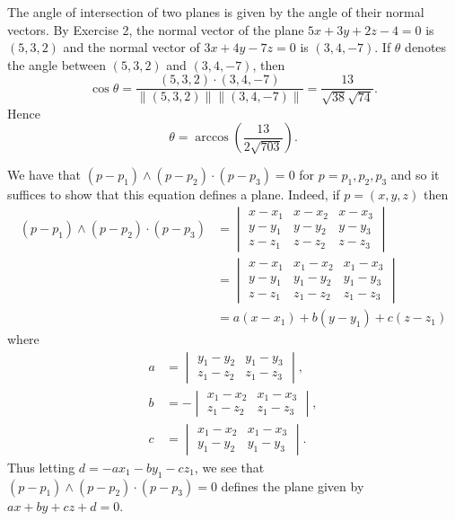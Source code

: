 \begin{ex}
The angle of intersection of two planes is given by the angle of their normal vectors. By Exercise 2, the normal vector of the plane $5x + 3y + 2z - 4 = 0$ is $(5, 3, 2)$ and the normal vector of $3x + 4y - 7z = 0$ is $(3, 4, -7)$. If $\theta$ denotes the angle between $(5, 3, 2)$ and $(3, 4, -7)$, then \[\cos\theta = \frac{(5, 3, 2)\cdot(3, 4, -7)}{\|(5, 3, 2)\|\|(3, 4, -7)\|} = \frac{13}{\sqrt{38}\sqrt{74}}.\] Hence \[\theta = \arccos\left(\frac{13}{2\sqrt{703}}\right).\]
\end{ex}

\begin{ex}
[TODO]
\end{ex}

\begin{ex}
We have that $(p-p_1)\wedge(p-p_2)\cdot(p-p_3) = 0$ for $p = p_1, p_2, p_3$ and so it suffices to show that this equation defines a plane. Indeed, if $p = (x, y, z)$ then
\begin{align*}
(p-p_1)\wedge(p-p_2)\cdot(p-p_3) & = \begin{vmatrix}
x-x_1 & x-x_2 & x-x_3\\
y-y_1 & y-y_2 & y-y_3\\
z-z_1 & z-z_2 & z-z_3
\end{vmatrix}\\
& = \begin{vmatrix}
x-x_1 & x_1-x_2 & x_1-x_3\\
y-y_1 & y_1-y_2 & y_1-y_3\\
z-z_1 & z_1-z_2 & z_1-z_3
\end{vmatrix}\\
& = a(x-x_1) + b(y-y_1) + c(z-z_1)
\end{align*}
where
\begin{align*}
a & = \begin{vmatrix}
y_1-y_2 & y_1-y_3\\
z_1-z_2 & z_1-z_3
\end{vmatrix},\\
b & = -\begin{vmatrix}
x_1-x_2 & x_1-x_3\\
z_1-z_2 & z_1-z_3
\end{vmatrix},\\
c & = \begin{vmatrix}
x_1-x_2 & x_1-x_3\\
y_1-y_2 & y_1-y_3
\end{vmatrix}.
\end{align*}
Thus letting $d = -ax_1-by_1-cz_1$, we see that $(p-p_1)\wedge(p-p_2)\cdot(p-p_3) = 0$ defines the plane given by $ax+by+cz+d = 0$.
\end{ex}

